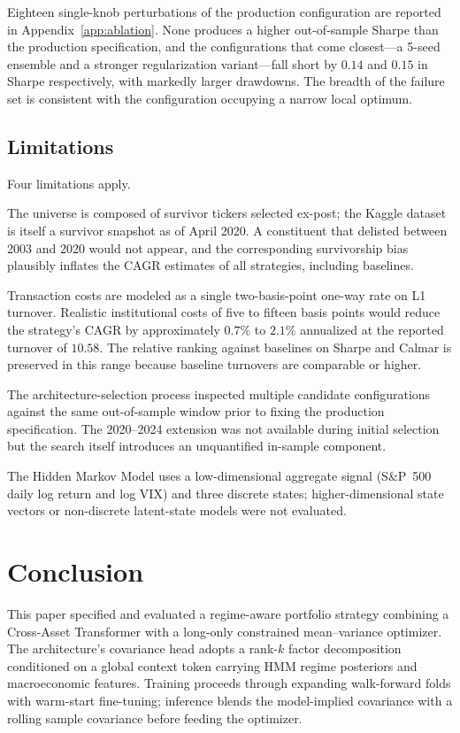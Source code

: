 \documentclass[11pt]{article}
\begin{document}
Eighteen single-knob perturbations of the production configuration are
reported in Appendix~\ref{app:ablation}. None produces a higher
out-of-sample Sharpe than the production specification, and the
configurations that come closest---a 5-seed ensemble and a stronger
regularization variant---fall short by $0.14$ and $0.15$ in Sharpe
respectively, with markedly larger drawdowns. The breadth of the
failure set is consistent with the configuration occupying a narrow
local optimum.

\subsection{Limitations}

Four limitations apply.

The universe is composed of survivor tickers selected ex-post; the
Kaggle dataset is itself a survivor snapshot as of April 2020. A
constituent that delisted between 2003 and 2020 would not appear, and
the corresponding survivorship bias plausibly inflates the CAGR
estimates of all strategies, including baselines.

Transaction costs are modeled as a single two-basis-point one-way rate
on L1 turnover. Realistic institutional costs of five to fifteen basis
points would reduce the strategy's CAGR by approximately $0.7\%$ to
$2.1\%$ annualized at the reported turnover of $10.58$. The relative
ranking against baselines on Sharpe and Calmar is preserved in this
range because baseline turnovers are comparable or higher.

The architecture-selection process inspected multiple candidate
configurations against the same out-of-sample window prior to fixing
the production specification. The 2020--2024 extension was not available
during initial selection but the search itself introduces an
unquantified in-sample component.

The Hidden Markov Model uses a low-dimensional aggregate signal
(S\&P~500 daily log return and log VIX) and three discrete states;
higher-dimensional state vectors or non-discrete latent-state models
were not evaluated.

\section{Conclusion}\label{sec:conclusion}

This paper specified and evaluated a regime-aware portfolio strategy
combining a Cross-Asset Transformer with a long-only constrained
mean--variance optimizer. The architecture's covariance head adopts a
rank-$k$ factor decomposition conditioned on a global context token
carrying HMM regime posteriors and macroeconomic features. Training
proceeds through expanding walk-forward folds with warm-start fine-tuning;
inference blends the model-implied covariance with a rolling sample
covariance before feeding the optimizer.
\end{document}
